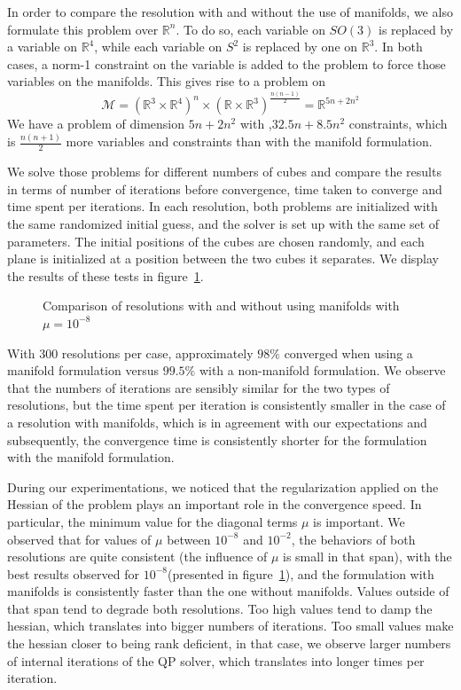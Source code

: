 In order to compare the resolution with and without the use of manifolds, we also formulate this problem over $\mathbb{R}^n$.
To do so, each variable on $SO(3)$ is replaced by a variable on $\mathbb{R}^4$, while each variable on $S^2$ is replaced by one on $\mathbb{R}^3$.
In both cases, a norm-1 constraint on the variable is added to the problem to force those variables on the manifolds.
This gives rise to a problem on
\begin{equation}
  \mathcal{M}={\left( \mathbb{R}^3\times \mathbb{R}^4 \right)}^n \times {\left( \mathbb{R} \times \mathbb{R}^3 \right)}^{\frac{n(n-1)}{2}} = \mathbb{R}^{5n+2n^2} \nonumber
\end{equation}
We have a problem of dimension $5n+2n^2$ with ,$32.5n+8.5n^2$ constraints, which is $\frac{n(n+1)}{2}$ more variables and constraints than with the manifold formulation.

We solve those problems for different numbers of cubes and compare the results in terms of number of iterations before convergence, time taken to converge and time spent per iterations.
In each resolution, both problems are initialized with the same randomized initial guess, and the solver is set up with the same set of parameters.
The initial positions of the cubes are chosen randomly, and each plane is initialized at a position between the two cubes it separates.
We display the results of these tests in figure~\ref{fig:timings-cubes}.

\begin{figure}[htpb]
  \centering
  
  \caption{Comparison of resolutions with and without using manifolds with $\mu=10^{-8}$}
\label{fig:timings-cubes}
\end{figure}

With 300 resolutions per case, approximately $98\%$ converged when using a manifold formulation versus $99.5\%$ with a non-manifold formulation.
We observe that the numbers of iterations are sensibly similar for the two types of resolutions, but the time spent per iteration is consistently smaller in the case of a resolution with manifolds, which is in agreement with our expectations and subsequently, the convergence time is consistently shorter for the formulation with the manifold formulation.

During our experimentations, we noticed that the regularization applied on the Hessian of the problem plays an important role in the convergence speed.
In particular, the minimum value for the diagonal terms $\mu$ is important.
We observed that for values of $\mu$ between $10^{-8}$ and $10^{-2}$, the behaviors of both resolutions are quite consistent (the influence of $\mu$ is small in that span), with the best results observed for $10^{-8}$(presented in figure~\ref{fig:timings-cubes}), and the formulation with manifolds is consistently faster than the one without manifolds.
Values outside of that span tend to degrade both resolutions.
Too high values tend to damp the hessian, which translates into bigger numbers of iterations.
Too small values make the hessian closer to being rank deficient, in that case, we observe larger numbers of internal iterations of the QP solver, which translates into longer times per iteration.


